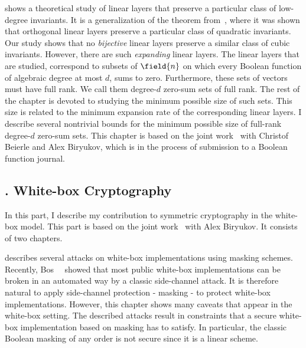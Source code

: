 \textbf{} shows a theoretical study of linear layers that preserve a particular class of low-degree invariants. It is a generalization of the theorem from~\cite{NonlinInv}, where it was shown that orthogonal linear layers preserve a particular class of quadratic invariants. Our study shows that no \emph{bijective} linear layers preserve a similar class of cubic invariants. However, there are such \emph{expanding} linear layers. The linear layers that are studied, correspond to subsets of $\field{n}$ on which every Boolean function of algebraic degree at most $d$, sums to zero. Furthermore, these sets of vectors must have full rank. We call them degree-$d$ zero-sum sets of full rank. The rest of the chapter is devoted to studying the minimum possible size of such sets. This size is related to the minimum expansion rate of the corresponding linear layers. I describe several nontrivial bounds for the minimum possible size of full-rank degree-$d$ zero-sum sets. This chapter is based on the joint work~\cite{OurNLI} with Christof Beierle and Alex Biryukov, which is in the process of submission to a Boolean function journal.


\subsection{. White-box Cryptography}

In this part, I describe my contribution to symmetric cryptography in the white-box model. This part is based on the joint work~\cite{OurWhitebox} with Alex Biryukov. It consists of two chapters. 

\textbf{} describes several attacks on white-box implementations using masking schemes. Recently, Bos~\etal~\cite{AttackBos} showed that most public white-box implementations can be broken in an automated way by a classic side-channel attack.
It is therefore natural to apply side-channel protection - masking - to protect white-box implementations. However, this chapter shows many caveats that appear in the white-box setting. The described attacks result in constraints that a secure white-box implementation based on masking has to satisfy. In particular, the classic Boolean masking of any order is not secure since it is a linear scheme. 

